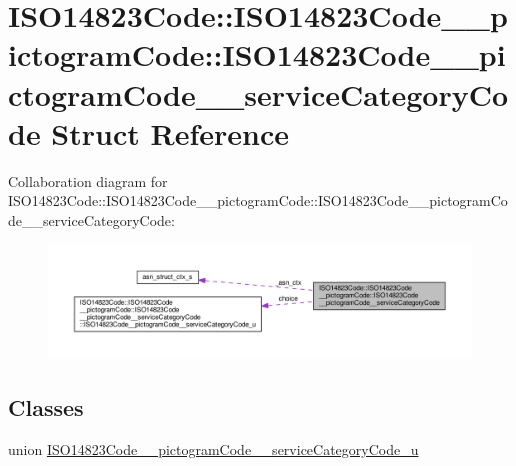 \hypertarget{structISO14823Code_1_1ISO14823Code____pictogramCode_1_1ISO14823Code____pictogramCode____serviceCategoryCode}{}\section{I\+S\+O14823\+Code\+:\+:I\+S\+O14823\+Code\+\_\+\+\_\+pictogram\+Code\+:\+:I\+S\+O14823\+Code\+\_\+\+\_\+pictogram\+Code\+\_\+\+\_\+service\+Category\+Code Struct Reference}
\label{structISO14823Code_1_1ISO14823Code____pictogramCode_1_1ISO14823Code____pictogramCode____serviceCategoryCode}


Collaboration diagram for I\+S\+O14823\+Code\+:\+:I\+S\+O14823\+Code\+\_\+\+\_\+pictogram\+Code\+:\+:I\+S\+O14823\+Code\+\_\+\+\_\+pictogram\+Code\+\_\+\+\_\+service\+Category\+Code\+:\nopagebreak
\begin{figure}[H]
\begin{center}
\leavevmode
\includegraphics[width=350pt]{structISO14823Code_1_1ISO14823Code____pictogramCode_1_1ISO14823Code____pictogramCode____serviceCategoryCode__coll__graph}
\end{center}
\end{figure}
\subsection*{Classes}
\begin{DoxyCompactItemize}
\item 
union \hyperlink{unionISO14823Code_1_1ISO14823Code____pictogramCode_1_1ISO14823Code____pictogramCode____serviceCae55999a37109a17de215317f84c86695}{I\+S\+O14823\+Code\+\_\+\+\_\+pictogram\+Code\+\_\+\+\_\+service\+Category\+Code\+\_\+u}
\end{DoxyCompactItemize}
